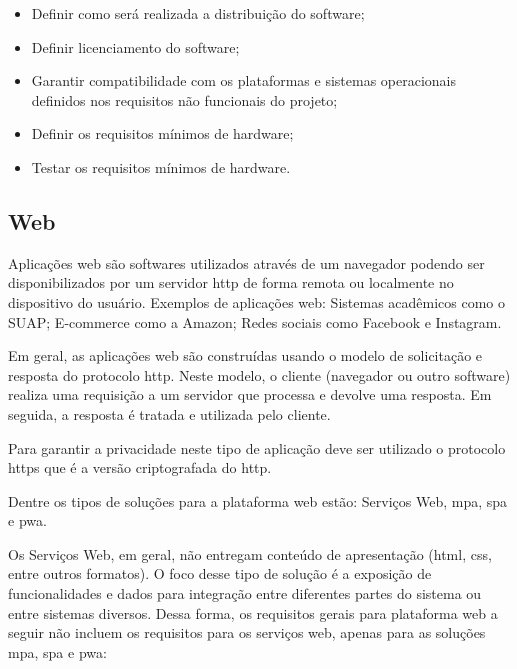 \begin{itemize}
  \item Definir como será realizada a distribuição do software;
  
  \item Definir licenciamento do software;
  
  \item Garantir compatibilidade com os plataformas e sistemas operacionais definidos nos requisitos não funcionais do projeto;
  
  \item Definir os requisitos mínimos de hardware;
  
  \item Testar os requisitos mínimos de hardware.
\end{itemize}

\subsection{Web}
Aplicações web são softwares utilizados através de um navegador podendo ser disponibilizados por um servidor \ac{http} de forma remota ou localmente no dispositivo do usuário. Exemplos de aplicações web: Sistemas acadêmicos como o SUAP; E-commerce como a Amazon; Redes sociais como Facebook e Instagram.

Em geral, as aplicações web são construídas usando o modelo de solicitação e resposta do protocolo \ac{http}. Neste modelo, o cliente (navegador ou outro software) realiza uma requisição a um servidor que processa e devolve uma resposta. Em seguida, a resposta é tratada e utilizada pelo cliente. 

Para garantir a privacidade neste tipo de aplicação deve ser utilizado o protocolo \ac{https} que é a versão criptografada do \ac{http}.

Dentre os tipos de soluções para a plataforma web estão:  Serviços Web, \ac{mpa}, \ac{spa} e \ac{pwa}.

Os Serviços Web, em geral, não entregam conteúdo de apresentação (\ac{html}, \ac{css}, entre outros formatos). O foco desse tipo de solução é a exposição de funcionalidades e dados para integração entre diferentes partes do sistema ou entre sistemas diversos. Dessa forma, os requisitos gerais para plataforma web a seguir não incluem os requisitos para os serviços web, apenas para as soluções \ac{mpa}, \ac{spa} e \ac{pwa}:

